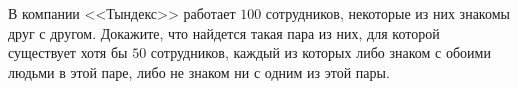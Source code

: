 \documentclass{article}
\begin{document}
В компании <<Тындекс>> работает $100$ сотрудников, некоторые из них знакомы друг с другом. Докажите, что найдется такая пара из них, для которой существует хотя бы $50$ сотрудников, каждый из которых либо знаком с обоими людьми в этой паре, либо не знаком ни с одним из этой пары.
\end{document}

